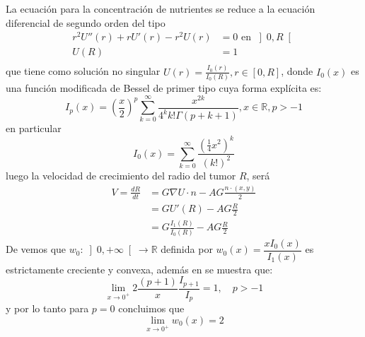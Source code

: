La ecuación para la concentración de nutrientes se reduce a la ecuación diferencial de segundo orden del tipo
\begin{equation}
	\begin{aligned}
		r^2 U''(r)+rU'(r)-r^2U(r)&= 0 \text{ en }  \left]0,R\right[\\
		U(R) &= 1\\
	\end{aligned}
	\label{eqn:edocircular}
\end{equation}
que tiene como solución no singular  $U(r)=\frac{I_0(r)}{I_0(R)},r\in[0,R]$, donde $I_0(x)$ es una función modificada de Bessel de primer tipo \citep{gradshteyn2014table} cuya forma explícita es: 
\[
I_p(x)=\left( \frac{x}{2} \right)^p \sum_{k=0}^\infty \frac{x^{2k}}{4^k k!\Gamma(p+k+1)},x\in\mathbb{R},p>-1
\]
en particular
\[
I_0(x)=\sum_{k=0}^\infty \frac{(\frac{1}{4}x^2)^k}{(k!)^2}
\]
luego la velocidad de crecimiento del radio del tumor $R$, será
\begin{equation}
	\begin{aligned}
		V=\frac{dR}{dt}&=G\nabla U\cdot n-AG\frac{n\cdot(x,y)}{2}\\
		&=GU'(R)-AG\frac{R}{2}\\
		&=G\frac{I_1(R)}{I_0(R)}-AG\frac{R}{2}	
	\end{aligned}
	\label{eqn:edoradiotumor}
\end{equation}
De \citep{simpson1984some} vemos que $w_0:\left]0,+\infty\right[\to\mathbb{R}$ definida por $w_0(x)=\dfrac{xI_0(x)}{I_1(x)}$ es estrictamente creciente y convexa, %
además en \citep{garofalo2020two} se muestra que:
\[
\lim_{x\to 0^+} 2\frac{(p+1)}{x}\frac{I_{p+1}}{I_p}=1,\quad p>-1
\]
y por lo tanto para $p=0$ concluimos que \[
\lim_{x\to 0^+} w_0(x)=2\]

